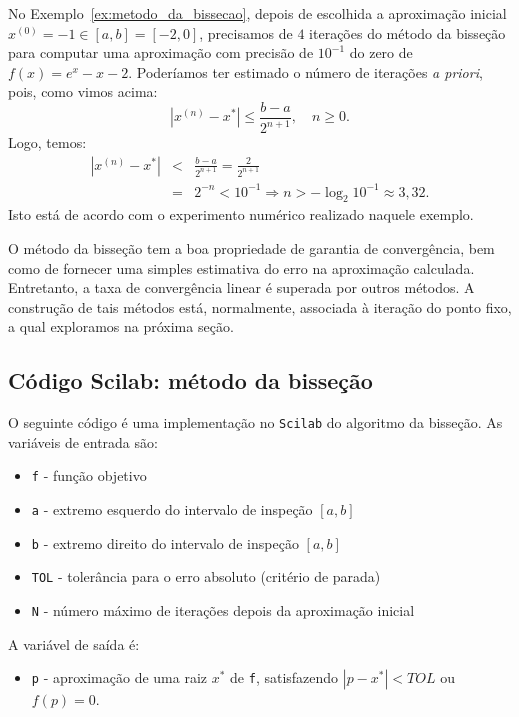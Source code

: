 \begin{ex}No Exemplo~\ref{ex:metodo_da_bissecao}, depois de escolhida a aproximação inicial $x^{(0)} = -1 \in [a, b] = [-2, 0]$, precisamos de $4$ iterações do método da bisseção para computar uma aproximação com precisão de $10^{-1}$ do zero de $f(x) = e^x - x - 2$. Poderíamos ter estimado o número de iterações \emph{a priori}, pois, como vimos acima:
  \begin{equation}
    |x^{(n)}-x^*|\leq \frac{b-a}{2^{n+1}},\quad n\geq 0.
  \end{equation}
Logo, temos:
\begin{eqnarray}
  |x^{(n)} - x^*| &<& \frac{b - a}{2^{n+1}} = \frac{2}{2^{n+1}}\\
  &=& 2^{-n} < 10^{-1} \Rightarrow  n > -\log_2 10^{-1} \approx 3,32.
\end{eqnarray}
Isto está de acordo com o experimento numérico realizado naquele exemplo.
\end{ex}

O método da bisseção tem a boa propriedade de garantia de convergência, bem como de fornecer uma simples estimativa do erro na aproximação calculada. Entretanto, a taxa de convergência linear é superada por outros métodos. A construção de tais métodos está, normalmente, associada à iteração do ponto fixo, a qual exploramos na próxima seção.

\ifisscilab
\subsection{Código Scilab: método da bisseção}\label{subsec:codigo_bissecao}

O seguinte código é uma implementação no \verb+Scilab+ do algoritmo da bisseção. As variáveis de entrada são:
\begin{itemize}
\item \verb+f+ - função objetivo
\item \verb+a+ - extremo esquerdo do intervalo de inspeção $[a, b]$
\item \verb+b+ - extremo direito do intervalo de inspeção $[a, b]$
\item \verb+TOL+ - tolerância para o erro absoluto (critério de parada)
\item \verb+N+ - número máximo de iterações depois da aproximação inicial
\end{itemize}
A variável de saída é:
\begin{itemize}
\item \verb+p+ - aproximação de uma raiz $x^*$ de \verb+f+, satisfazendo $|p - x^*|< TOL$ ou $f(p) = 0$.
\end{itemize}

